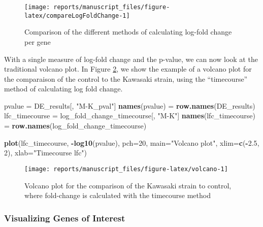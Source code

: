 \documentclass[9pt,a4paper,]{extarticle}
\newenvironment{Shaded}{\begin{snugshade}}{\end{snugshade}}
\newcommand{\DataTypeTok}[1]{\textcolor[rgb]{0.13,0.29,0.53}{#1}}
\newcommand{\DecValTok}[1]{\textcolor[rgb]{0.00,0.00,0.81}{#1}}
\newcommand{\FloatTok}[1]{\textcolor[rgb]{0.00,0.00,0.81}{#1}}
\newcommand{\KeywordTok}[1]{\textcolor[rgb]{0.13,0.29,0.53}{\textbf{#1}}}
\newcommand{\NormalTok}[1]{#1}
\newcommand{\OperatorTok}[1]{\textcolor[rgb]{0.81,0.36,0.00}{\textbf{#1}}}
\newcommand{\StringTok}[1]{\textcolor[rgb]{0.31,0.60,0.02}{#1}}
\begin{document}
\begin{figure}[H]

{\centering \texttt{[image: reports/manuscript\_files/figure-latex/compareLogFoldChange-1]} 

}

\caption{Comparison of the different methods of calculating log-fold change per gene}\label{fig:compareLogFoldChange}
\end{figure}

With a single measure of log-fold change and the p-value, we can now look
at the traditional volcano plot. In Figure \ref{fig:volcano}, we show the example of a volcano plot for the comparaison
of the control to the Kawasaki strain, using the ``timecourse'' method of calculating log fold change.

\begin{Shaded}
\begin{Highlighting}[]
\NormalTok{pvalue =}\StringTok{ }\NormalTok{DE_results[, }\StringTok{"M-K_pval"}\NormalTok{]}
\KeywordTok{names}\NormalTok{(pvalue) =}\StringTok{ }\KeywordTok{row.names}\NormalTok{(DE_results)}
\NormalTok{lfc_timecourse =}\StringTok{ }\NormalTok{log_fold_change_timecourse[, }\StringTok{"M-K"}\NormalTok{]}
\KeywordTok{names}\NormalTok{(lfc_timecourse) =}\StringTok{ }\KeywordTok{row.names}\NormalTok{(log_fold_change_timecourse)}

\KeywordTok{plot}\NormalTok{(lfc_timecourse, }\OperatorTok{-}\KeywordTok{log10}\NormalTok{(pvalue), }\DataTypeTok{pch=}\DecValTok{20}\NormalTok{, }\DataTypeTok{main=}\StringTok{"Volcano plot"}\NormalTok{,}
     \DataTypeTok{xlim=}\KeywordTok{c}\NormalTok{(}\OperatorTok{-}\FloatTok{2.5}\NormalTok{, }\DecValTok{2}\NormalTok{), }\DataTypeTok{xlab=}\StringTok{"Timecourse lfc"}\NormalTok{)}
\end{Highlighting}
\end{Shaded}

\begin{figure}[H]

{\centering \texttt{[image: reports/manuscript\_files/figure-latex/volcano-1]} 

}

\caption{Volcano plot for the comparison of the Kawasaki strain to control, where fold-change is calculated with the timecourse method}\label{fig:volcano}
\end{figure}

\hypertarget{visualizing-genes-of-interest}{%
\subsubsection{Visualizing Genes of Interest}\label{visualizing-genes-of-interest}}
\end{document}
